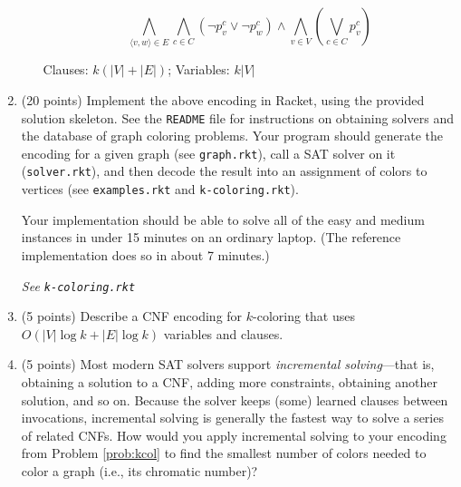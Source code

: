 \documentclass{article}
\newenvironment{solution}{\color{blue} \em }{}
\begin{document}
\begin{enumerate}
\begin{enumerate}
\begin{solution}
    $$\bigwedge_{\langle v, w \rangle \in E} \bigwedge_{c \in C} (\neg p_v^c \lor \neg p_w^c)
     \land \bigwedge_{v \in V} (\bigvee_{c \in C} p^c_v)  $$


     Clauses: $ k(|V| + |E|)$;
     Variables: $k|V|$

\end{solution}


\end{enumerate} \label{prob:encoding}

\item (20 points) \label{prob:kcol} Implement the above encoding in Racket, using the provided solution skeleton.  See the \texttt{README} file for instructions on obtaining solvers and the database of graph coloring problems.  Your program should generate the encoding for a given graph (see \texttt{graph.rkt}), call a SAT solver on it (\texttt{solver.rkt}), and then decode the result into an assignment of colors to vertices  (see \texttt{examples.rkt} and \texttt{k-coloring.rkt}).

Your implementation should be able to solve all of the easy and medium instances in under 15 minutes on an ordinary laptop.
(The reference implementation does so in about 7 minutes.)

\begin{solution}
	See \texttt{k-coloring.rkt}
\end{solution}

\item (5 points) Describe a CNF encoding for $k$-coloring that uses $O(|V|\log k+|E|\log k)$ variables and clauses.



\item (5 points) Most modern SAT solvers support \emph{incremental solving}---that is, obtaining a solution to a CNF, adding more constraints, obtaining another solution, and so on.  Because the solver keeps (some) learned clauses between invocations, incremental solving is  generally the fastest way to solve a series of related CNFs.  How would you apply incremental solving to your encoding from Problem \ref{prob:kcol} to find the smallest number of colors needed to color a graph (i.e., its chromatic number)?  \label{prob:last}


\end{enumerate}
\end{document}
